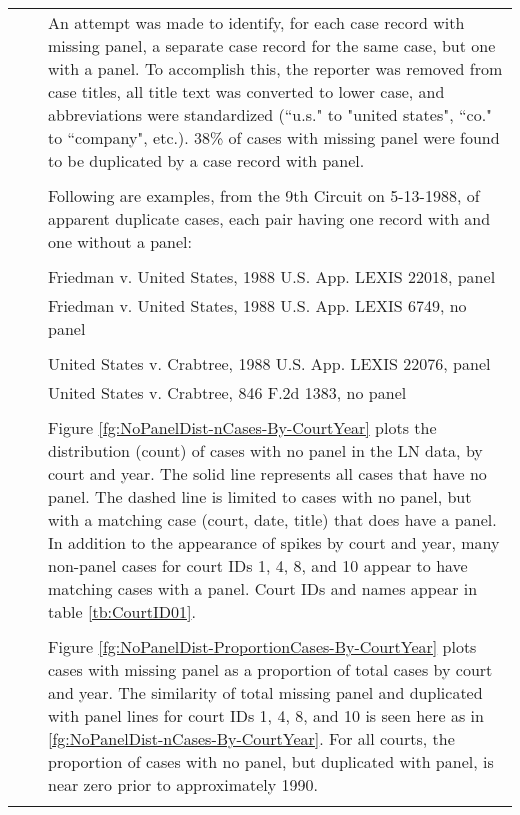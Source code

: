 \documentclass[10pt, letterpaper]{article}
\begin{document}
\begin{spacing}{1.0}
\begin{longtable}{p{0.25in}p{0.25in}p{6in}}
    & & \color{red} An attempt was made to identify, for each case record with missing panel, a separate case record for the same case, but one with a panel.  To accomplish this, the reporter was removed from case titles, all title text was converted to lower case, and abbreviations were standardized (``u.s." to "united states", ``co." to ``company", etc.).  38\% of cases with missing panel were found to be duplicated by a case record with panel.\\\\
    
    & & \color{red}Following are examples, from the 9th Circuit on 5-13-1988, of apparent duplicate cases, each pair having one record with and one without a panel:\\\\
    & & \color{red}Friedman v. United States, 1988 U.S. App. LEXIS 22018, panel\\
    & & \color{red}Friedman v. United States, 1988 U.S. App. LEXIS 6749, no panel\\\\
    & & \color{red}United States v. Crabtree, 1988 U.S. App. LEXIS 22076, panel\\
    & & \color{red}United States v. Crabtree, 846 F.2d 1383, no panel\\\\

    & & \color{red}Figure \ref{fg:NoPanelDist-nCases-By-CourtYear} plots the distribution (count) of cases with no panel in the LN data, by court and year.  The solid line represents all cases that have no panel.  The dashed line is limited to cases with no panel, but with a matching case (court, date, title) that does have a panel.  In addition to the appearance of spikes by court and year, many non-panel cases for court IDs 1, 4, 8, and 10 appear to have matching cases with a panel.  Court IDs and names appear in table \ref{tb:CourtID01}.\\\\
    
    & & \color{red}Figure \ref{fg:NoPanelDist-ProportionCases-By-CourtYear} plots cases with missing panel as a proportion of total cases by court and year.  The similarity of total missing panel and duplicated with panel lines for court IDs 1, 4, 8, and 10 is seen here as in \ref{fg:NoPanelDist-nCases-By-CourtYear}.  For all courts, the proportion of cases with no panel, but duplicated with panel, is near zero prior to approximately 1990.\\\\
    

\end{longtable}
\end{spacing}
\end{document}
